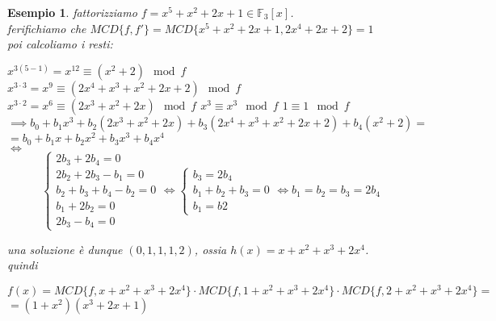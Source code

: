\documentclass[a4paper,12pt]{article}
\theoremstyle{def}
\theoremstyle{prop}
\theoremstyle{esempio}
\newtheorem*{example}{Esempio}
\theoremstyle{dimostrazione}
\theoremstyle{teo}
\theoremstyle{osservazione}
\begin{document}
\begin{example}
	fattorizziamo \(f = x^5 + x^2 + 2x + 1 \in \mathbb{F}_3[x]\).\\
	ferifichiamo che \(MCD\{f, f'\} = MCD\{ x^5 + x^2 + 2x + 1, 2x^4 + 2x + 2\} = 1\)\\
	poi calcoliamo i resti:
	\begin{center}
		\(x^{3(5-1)} = x^{12} \equiv (x^2 + 2) \mod f\)
		\(x^{3\cdot3} = x^9 \equiv (2x^4 + x^3 + x^2 + 2x + 2) \mod f\)
		\(x^{3 \cdot 2} = x^6 \equiv (2x^3 + x^2 + 2x) \mod f\)
		\(x^3 \equiv x^3 \mod f\)
		\(1 \equiv 1 \mod f\)
		\(\implies b_0 + b_1 x^3 + b_2(2x^3 + x^2 + 2x) + b_3 (2x^4 + x^3 + x^2 + 2x + 2) + b_4(x^2 + 2) = \)\\
		\(= b_0 + b_1 x + b_2x^2 + b_3 x^3 + b_4 x^4\)\\
		\(\iff\) \[
			\begin{cases}
				2 b_3 + 2 b_4 = 0         \\
				2 b_2 + 2 b_3 - b_1 = 0   \\
				b_2 + b_3 + b_4 - b_2 = 0 \\
				b_1 + 2 b_2 = 0           \\
				2 b_3 - b_4 = 0
			\end{cases}
			\iff
			\begin{cases}
				b_3 = 2 b_4         \\
				b_1 + b_2 + b_3 = 0 \\
				b_1 = b2
			\end{cases}
			\iff
			b_1 = b_2 = b_3 = 2 b_4
		\]
	\end{center}
	una soluzione è dunque \((0, 1, 1, 1, 2)\), ossia \(h(x) =x + x^2 + x^3 +2 x^4\).\\
	quindi
	\begin{center}
		\(f(x) = MCD\{f, x + x^2 + x^3 +2 x^4\} \cdot MCD\{f, 1 + x^2 + x^3 +2 x^4\} \cdot MCD\{f, 2 + x^2 + x^3 + 2x^4\} = \)\\
		\(= (1 + x^2)(x^3 + 2x + 1)\)
	\end{center}
\end{example}
\end{document}
